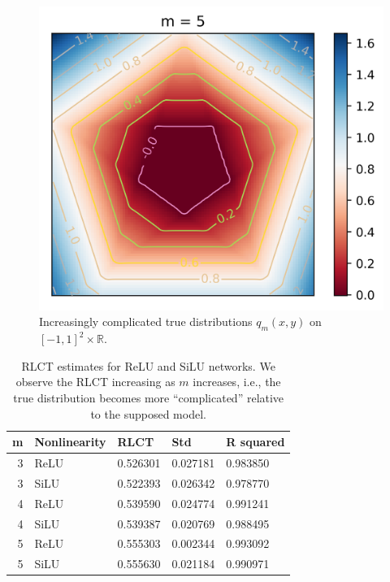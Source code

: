 \documentclass[11pt]{article}
\numberwithin{equation}{section}
\theoremstyle{plain}
\theoremstyle{definition}
\begin{document}
\begin{figure}[h]
\begin{center}
		\includegraphics[scale=0.5]{truedist5.png}
	\end{center}
	\caption{Increasingly complicated true distributions $q_m(x,y)$ on $[-1,1]^2 \times \mathbb{R}$.}
	\label{fig:simp_func_complex}
\end{figure}

\begin{table}[h]
	\centering
	\caption{\footnotesize RLCT estimates for ReLU and SiLU networks. We observe the RLCT increasing as $m$ increases, i.e., the true distribution becomes more ``complicated'' relative to the supposed model.}
	\label{table:hyper}
		\begin{tabular}
			{r l l l l}
			\toprule
			\textbf{m}  & \textbf{Nonlinearity}  & \textbf{RLCT} & \textbf{Std} & \textbf{R squared}\\ 
			\midrule
			3 & ReLU & 0.526301 & 0.027181 & 0.983850\\
			3 & SiLU & 0.522393 & 0.026342 & 0.978770\\
			\hline
			4 & ReLU & 0.539590 & 0.024774 & 0.991241\\
			4 & SiLU & 0.539387 & 0.020769 & 0.988495\\
			\hline
			5 & ReLU & 0.555303 & 0.002344 & 0.993092\\
			5 & SiLU & 0.555630 & 0.021184 & 0.990971\\
			\bottomrule
		\end{tabular}
\end{table}
\end{document}

